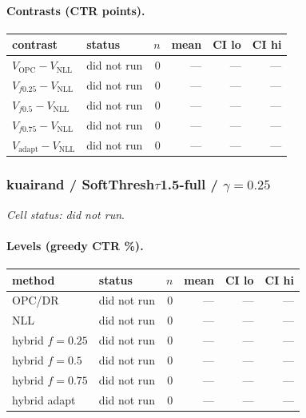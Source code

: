 \documentclass[10pt,a4paper]{article}
\begin{document}
\paragraph{Contrasts (CTR points).}
{\centering\small\begin{tabular}{llrrrr}
\toprule contrast & status & $n$ & mean & CI lo & CI hi \\
\midrule
$V_{\mathrm{OPC}}-V_{\mathrm{NLL}}$ & did not run & 0 & --- & --- & --- \\
$V_{f0.25}-V_{\mathrm{NLL}}$ & did not run & 0 & --- & --- & --- \\
$V_{f0.5}-V_{\mathrm{NLL}}$ & did not run & 0 & --- & --- & --- \\
$V_{f0.75}-V_{\mathrm{NLL}}$ & did not run & 0 & --- & --- & --- \\
$V_{\mathrm{adapt}}-V_{\mathrm{NLL}}$ & did not run & 0 & --- & --- & --- \\
\bottomrule\end{tabular}\par}
\bigskip
\subsubsection{kuairand / SoftThresh$\tau$1.5-full / $\gamma=0.25$}
\emph{Cell status: did not run}.
\paragraph{Levels (greedy CTR \%).}
{\centering\small\begin{tabular}{llrrrr}
\toprule method & status & $n$ & mean & CI lo & CI hi \\
\midrule
OPC/DR & did not run & 0 & --- & --- & --- \\
NLL & did not run & 0 & --- & --- & --- \\
hybrid $f{=}0.25$ & did not run & 0 & --- & --- & --- \\
hybrid $f{=}0.5$ & did not run & 0 & --- & --- & --- \\
hybrid $f{=}0.75$ & did not run & 0 & --- & --- & --- \\
hybrid adapt & did not run & 0 & --- & --- & --- \\
\bottomrule\end{tabular}\par}
\end{document}
